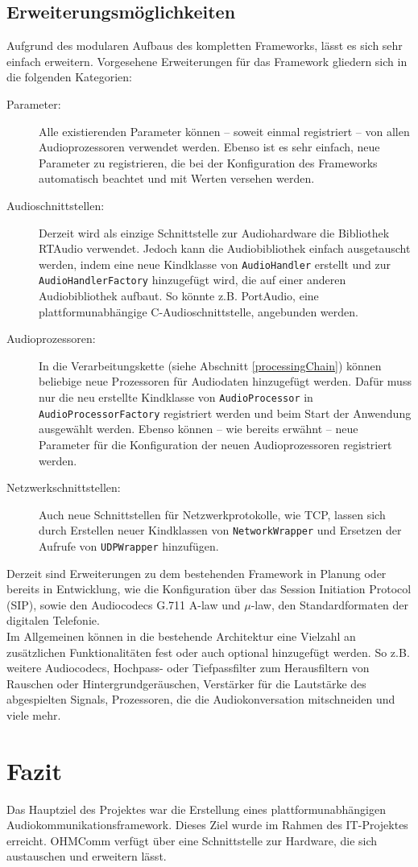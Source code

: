 \subsection{Erweiterungsmöglichkeiten}
Aufgrund des modularen Aufbaus des kompletten Frameworks, lässt es sich sehr einfach erweitern. Vorgesehene Erweiterungen für das Framework gliedern sich in die folgenden Kategorien:
\begin{description}
\item[Parameter:] Alle existierenden Parameter können -- soweit einmal registriert -- von allen Audioprozessoren verwendet werden. Ebenso ist es sehr einfach, neue Parameter zu registrieren, die bei der Konfiguration des Frameworks automatisch beachtet und mit Werten versehen werden.
\item[Audioschnittstellen:] Derzeit wird als einzige Schnittstelle zur Audiohardware die Bibliothek RTAudio verwendet. Jedoch kann die Audiobibliothek einfach ausgetauscht werden, indem eine neue Kindklasse von \texttt{AudioHandler} erstellt und zur \texttt{AudioHandlerFactory} hinzugefügt wird, die auf einer anderen Audiobibliothek aufbaut. So könnte z.B. PortAudio, eine plattformunabhängige C-Audioschnittstelle, angebunden werden.
\item[Audioprozessoren:] In die Verarbeitungskette (siehe Abschnitt \ref{processingChain}) können beliebige neue Prozessoren für Audiodaten hinzugefügt werden. Dafür muss nur die neu erstellte Kindklasse von \texttt{AudioProcessor} in \texttt{AudioProcessorFactory} registriert werden und beim Start der Anwendung ausgewählt werden. Ebenso können -- wie bereits erwähnt -- neue Parameter für die Konfiguration der neuen Audioprozessoren registriert werden.
\item[Netzwerkschnittstellen:] Auch neue Schnittstellen für Netzwerkprotokolle, wie TCP, lassen sich durch Erstellen neuer Kindklassen von \texttt{NetworkWrapper} und Ersetzen der Aufrufe von \texttt{UDPWrapper} hinzufügen.
\end{description}
Derzeit sind Erweiterungen zu dem bestehenden Framework in Planung oder bereits in Entwicklung, wie die Konfiguration über das Session Initiation Protocol (SIP), sowie den Audiocodecs G.711 A-law und $\mu$-law, den Standardformaten der digitalen Telefonie.
\\
Im Allgemeinen können in die bestehende Architektur eine Vielzahl an zusätzlichen Funktionalitäten fest oder auch optional hinzugefügt werden. So z.B. weitere Audiocodecs, Hochpass- oder Tiefpassfilter zum Herausfiltern von Rauschen oder Hintergrundgeräuschen, Verstärker für die Lautstärke des abgespielten Signals, Prozessoren, die die Audiokonversation mitschneiden und viele mehr.

\section{Fazit}
Das Hauptziel des Projektes war die Erstellung eines plattformunabhängigen Audiokommunikationsframework. Dieses Ziel wurde im Rahmen des IT-Projektes erreicht. OHMComm verfügt über eine Schnittstelle zur Hardware, die sich austauschen und erweitern lässt.